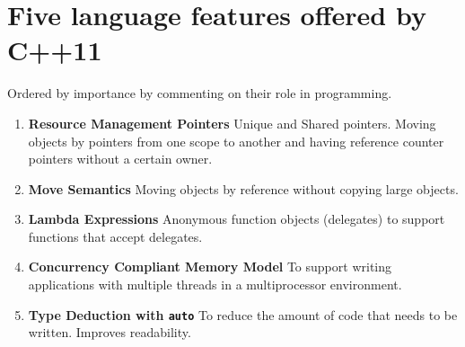 \documentclass{article}
\begin{document}
 \section*{Five language features offered by C++11}
 Ordered by importance by commenting on their role in programming.
 \begin{enumerate}
  \item \textbf{Resource Management Pointers} \- Unique and Shared pointers. Moving objects by pointers from one scope to another and having reference counter pointers without a certain owner.
  \item \textbf{Move Semantics} \- Moving objects by reference without copying large objects.
  \item \textbf{Lambda Expressions} \- Anonymous function objects (delegates) to support functions that accept delegates.
  \item \textbf{Concurrency Compliant Memory Model} \- To support writing applications with multiple threads in a multiprocessor environment.
  \item \textbf{Type Deduction with \texttt{auto}} \- To reduce the amount of code that needs to be written. Improves readability.
 \end{enumerate}
\end{document}
